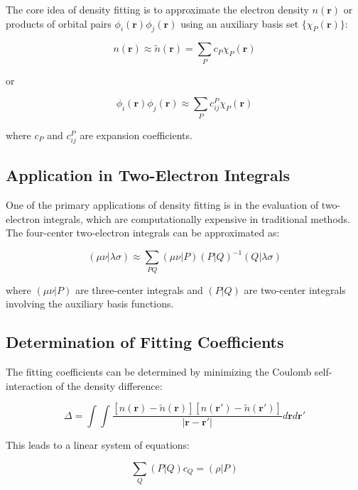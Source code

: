 The core idea of density fitting is to approximate the electron density $n(\mathbf{r})$ or products of orbital pairs $\phi_i(\mathbf{r})\phi_j(\mathbf{r})$ using an auxiliary basis set $\{\chi_P(\mathbf{r})\}$:

\begin{equation}
n(\mathbf{r}) \approx \tilde{n}(\mathbf{r}) = \sum_P c_P \chi_P(\mathbf{r})
\end{equation}

or

\begin{equation}
\phi_i(\mathbf{r})\phi_j(\mathbf{r}) \approx \sum_P c_{ij}^P \chi_P(\mathbf{r})
\end{equation}

where $c_P$ and $c_{ij}^P$ are expansion coefficients.

\subsection{Application in Two-Electron Integrals}

One of the primary applications of density fitting is in the evaluation of two-electron integrals, which are computationally expensive in traditional methods. The four-center two-electron integrals can be approximated as:

\begin{equation}
(\mu\nu|\lambda\sigma) \approx \sum_{PQ} (\mu\nu|P)(P|Q)^{-1}(Q|\lambda\sigma)
\end{equation}

where $(\mu\nu|P)$ are three-center integrals and $(P|Q)$ are two-center integrals involving the auxiliary basis functions.

\subsection{Determination of Fitting Coefficients}

The fitting coefficients can be determined by minimizing the Coulomb self-interaction of the density difference:

\begin{equation}
\Delta = \int\int \frac{[n(\mathbf{r}) - \tilde{n}(\mathbf{r})][n(\mathbf{r}') - \tilde{n}(\mathbf{r}')]}{|\mathbf{r} - \mathbf{r}'|} d\mathbf{r}d\mathbf{r}'
\end{equation}

This leads to a linear system of equations:

\begin{equation}
\sum_Q (P|Q) c_Q = (\rho|P)
\end{equation}

